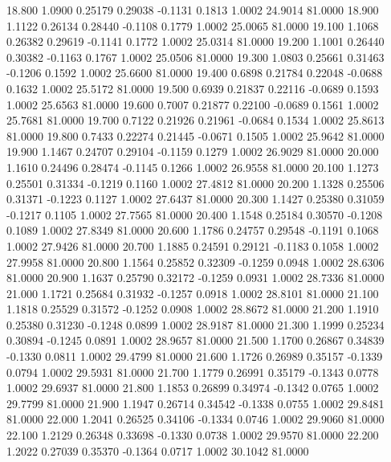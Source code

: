   18.800   1.0900   0.25179   0.29038  -0.1131   0.1813   1.0002  24.9014  81.0000
  18.900   1.1122   0.26134   0.28440  -0.1108   0.1779   1.0002  25.0065  81.0000
  19.100   1.1068   0.26382   0.29619  -0.1141   0.1772   1.0002  25.0314  81.0000
  19.200   1.1001   0.26440   0.30382  -0.1163   0.1767   1.0002  25.0506  81.0000
  19.300   1.0803   0.25661   0.31463  -0.1206   0.1592   1.0002  25.6600  81.0000
  19.400   0.6898   0.21784   0.22048  -0.0688   0.1632   1.0002  25.5172  81.0000
  19.500   0.6939   0.21837   0.22116  -0.0689   0.1593   1.0002  25.6563  81.0000
  19.600   0.7007   0.21877   0.22100  -0.0689   0.1561   1.0002  25.7681  81.0000
  19.700   0.7122   0.21926   0.21961  -0.0684   0.1534   1.0002  25.8613  81.0000
  19.800   0.7433   0.22274   0.21445  -0.0671   0.1505   1.0002  25.9642  81.0000
  19.900   1.1467   0.24707   0.29104  -0.1159   0.1279   1.0002  26.9029  81.0000
  20.000   1.1610   0.24496   0.28474  -0.1145   0.1266   1.0002  26.9558  81.0000
  20.100   1.1273   0.25501   0.31334  -0.1219   0.1160   1.0002  27.4812  81.0000
  20.200   1.1328   0.25506   0.31371  -0.1223   0.1127   1.0002  27.6437  81.0000
  20.300   1.1427   0.25380   0.31059  -0.1217   0.1105   1.0002  27.7565  81.0000
  20.400   1.1548   0.25184   0.30570  -0.1208   0.1089   1.0002  27.8349  81.0000
  20.600   1.1786   0.24757   0.29548  -0.1191   0.1068   1.0002  27.9426  81.0000
  20.700   1.1885   0.24591   0.29121  -0.1183   0.1058   1.0002  27.9958  81.0000
  20.800   1.1564   0.25852   0.32309  -0.1259   0.0948   1.0002  28.6306  81.0000
  20.900   1.1637   0.25790   0.32172  -0.1259   0.0931   1.0002  28.7336  81.0000
  21.000   1.1721   0.25684   0.31932  -0.1257   0.0918   1.0002  28.8101  81.0000
  21.100   1.1818   0.25529   0.31572  -0.1252   0.0908   1.0002  28.8672  81.0000
  21.200   1.1910   0.25380   0.31230  -0.1248   0.0899   1.0002  28.9187  81.0000
  21.300   1.1999   0.25234   0.30894  -0.1245   0.0891   1.0002  28.9657  81.0000
  21.500   1.1700   0.26867   0.34839  -0.1330   0.0811   1.0002  29.4799  81.0000
  21.600   1.1726   0.26989   0.35157  -0.1339   0.0794   1.0002  29.5931  81.0000
  21.700   1.1779   0.26991   0.35179  -0.1343   0.0778   1.0002  29.6937  81.0000
  21.800   1.1853   0.26899   0.34974  -0.1342   0.0765   1.0002  29.7799  81.0000
  21.900   1.1947   0.26714   0.34542  -0.1338   0.0755   1.0002  29.8481  81.0000
  22.000   1.2041   0.26525   0.34106  -0.1334   0.0746   1.0002  29.9060  81.0000
  22.100   1.2129   0.26348   0.33698  -0.1330   0.0738   1.0002  29.9570  81.0000
  22.200   1.2022   0.27039   0.35370  -0.1364   0.0717   1.0002  30.1042  81.0000
